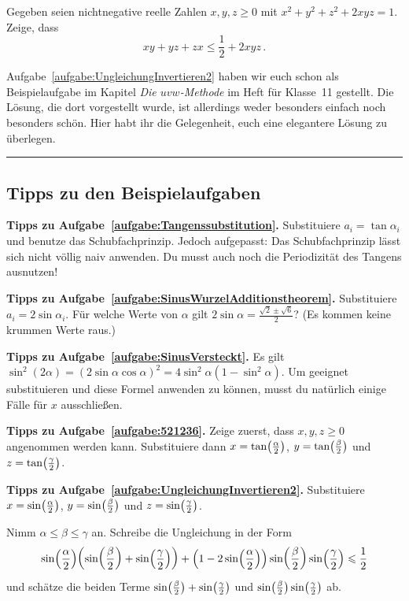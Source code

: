 \begin{aufgabe*}[*]\label{aufgabe:UngleichungInvertieren2}
	Gegeben seien nichtnegative reelle Zahlen $x,y,z\geqslant 0$ mit $x^2+y^2+z^2+2xyz=1$. Zeige, dass
	\begin{equation*}
		xy+yz+zx\leqslant \frac12+2xyz\,.
	\end{equation*}
\end{aufgabe*}
Aufgabe~\ref{aufgabe:UngleichungInvertieren2} haben wir euch schon als Beispielaufgabe im Kapitel \emph{Die $uvw$-Methode} im Heft für Klasse~11 gestellt. Die Lösung, die dort vorgestellt wurde, ist allerdings weder besonders einfach noch besonders schön. Hier habt ihr die Gelegenheit, euch eine elegantere Lösung zu überlegen.

\newpage\phantom{newpage}\vfill\hrule\vspace{-1em}



\subsection*{Tipps zu den Beispielaufgaben}

\textbf{Tipps zu Aufgabe~\ref{aufgabe:Tangenssubstitution}.} Substituiere $a_i=\tan \alpha_i$ und benutze das Schubfachprinzip. Jedoch aufgepasst: Das Schubfachprinzip lässt sich nicht völlig naiv anwenden. Du musst auch noch die Periodizität des Tangens ausnutzen!

\textbf{Tipps zu Aufgabe~\ref{aufgabe:SinusWurzelAdditionstheorem}.} Substituiere $a_i=2\sin\alpha_i$. Für welche Werte von $\alpha$ gilt $2\sin\alpha = \frac{\sqrt{2}\pm\sqrt{6}}{2}$? (Es kommen keine krummen Werte raus.)

\textbf{Tipps zu Aufgabe~\ref{aufgabe:SinusVersteckt}.} Es gilt $\sin^2(2\alpha)=(2\sin\alpha\cos\alpha)^2=4\sin^2\alpha(1-\sin^2\alpha)$. Um geeignet substituieren und diese Formel anwenden zu können, musst du natürlich einige Fälle für $x$ ausschließen.

\textbf{Tipps zu Aufgabe~\ref{aufgabe:521236}.} Zeige zuerst, dass $x,y,z\geqslant 0$ angenommen werden kann. Substituiere dann $x=\tan\parens[\big]{\frac{\alpha}2}$, $y=\tan\parens[\big]{\frac{\beta}2}$ und $z=\tan\parens[\big]{\frac{\gamma}2}$.

\textbf{Tipps zu Aufgabe~\ref{aufgabe:UngleichungInvertieren2}.} Substituiere $x=\sin\parens[\big]{\frac{\alpha}2}$, $y=\sin\parens[\big]{\frac{\beta}2}$ und $z=\sin\parens[\big]{\frac{\gamma}2}$.

Nimm $\alpha\leqslant \beta\leqslant \gamma$ an. Schreibe die Ungleichung in der Form
\begin{equation*}
	\sin\parens*{\frac{\alpha}2}\parens*{\sin\parens*{\frac{\beta}2}+\sin\parens*{\frac{\gamma}2}}+\parens*{1-2\sin\parens*{\frac{\alpha}2}}\sin\parens*{\frac{\beta}2}\sin\parens*{\frac{\gamma}2}\leqslant \frac12
\end{equation*}
und schätze die beiden Terme $\sin\parens[\big]{\frac{\beta}2}+\sin\parens[\big]{\frac{\gamma}2}$ und $\sin\parens[\big]{\frac{\beta}2}\sin\parens[\big]{\frac{\gamma}2}$ ab.